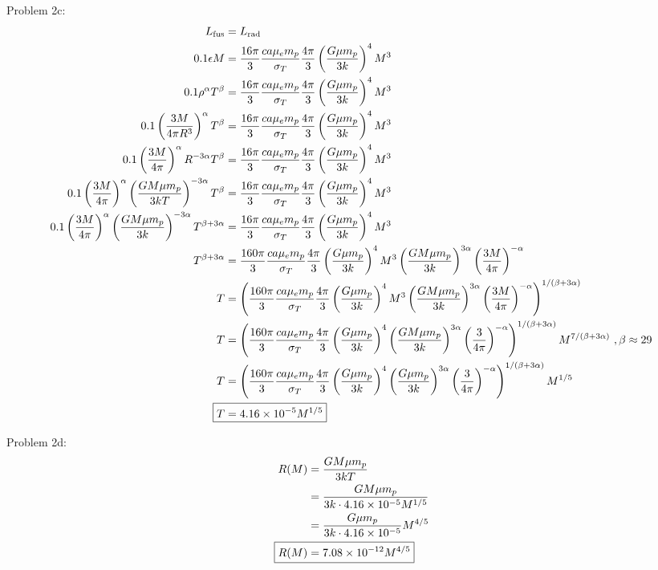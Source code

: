 \documentclass[10pt,letter,preprint]{aastex}
\newcommand{\rp}{\right)}
\newcommand{\lp}{\left(}
\begin{document}
\newpage
Problem 2c:\\
\begin{align}
L_{\textrm{fus}} &= L_{\textrm{rad}}\\
0.1 \epsilon M &=  \frac{16 \pi}{3} \frac{ca\mu_e m_p}{\sigma_T}\frac{4\pi}{3} \lp \frac{G\mu m_p}{3k} \rp^4 M^3 \\
0.1 \rho^\alpha T^\beta &=  \frac{16 \pi}{3} \frac{ca\mu_e m_p}{\sigma_T}\frac{4\pi}{3} \lp \frac{G\mu m_p}{3k} \rp^4 M^3 \\
0.1 \lp \frac{3M}{4 \pi R^3} \rp^\alpha T^\beta &=  \frac{16 \pi}{3} \frac{ca\mu_e m_p}{\sigma_T}\frac{4\pi}{3} \lp \frac{G\mu m_p}{3k} \rp^4 M^3\\
0.1 \lp \frac{3M}{4 \pi} \rp^\alpha R^{-3\alpha} T^\beta &=  \frac{16 \pi}{3} \frac{ca\mu_e m_p}{\sigma_T}\frac{4\pi}{3} \lp \frac{G\mu m_p}{3k} \rp^4 M^3\\
0.1 \lp \frac{3M}{4 \pi} \rp^\alpha \lp \frac{GM\mu m_p}{3kT} \rp^{-3\alpha} T^\beta &=  \frac{16 \pi}{3} \frac{ca\mu_e m_p}{\sigma_T}\frac{4\pi}{3} \lp \frac{G\mu m_p}{3k} \rp^4 M^3\\
0.1 \lp \frac{3M}{4 \pi} \rp^\alpha \lp \frac{GM\mu m_p}{3k} \rp^{-3\alpha} T^{\beta+3\alpha} &=  \frac{16 \pi}{3} \frac{ca\mu_e m_p}{\sigma_T}\frac{4\pi}{3} \lp \frac{G\mu m_p}{3k} \rp^4 M^3\\
 T^{\beta+3\alpha} &=  \frac{160 \pi}{3} \frac{ca\mu_e m_p}{\sigma_T}\frac{4\pi}{3} \lp \frac{G\mu m_p}{3k} \rp^4 M^3  \lp \frac{GM\mu m_p}{3k} \rp^{3\alpha} \lp \frac{3M}{4 \pi} \rp^{-\alpha}\\
 T &= \lp \frac{160 \pi}{3} \frac{ca\mu_e m_p}{\sigma_T}\frac{4\pi}{3} \lp \frac{G\mu m_p}{3k} \rp^4 M^3  \lp \frac{GM\mu m_p}{3k} \rp^{3\alpha} \lp \frac{3M}{4 \pi} \rp^{-\alpha} \rp^{1/(\beta + 3\alpha)}\\
 T &= \lp \frac{160 \pi}{3} \frac{ca\mu_e m_p}{\sigma_T}\frac{4\pi}{3} \lp \frac{G\mu m_p}{3k} \rp^4  \lp \frac{GM\mu m_p}{3k} \rp^{3\alpha} \lp \frac{3}{4 \pi} \rp^{-\alpha} \rp^{1/(\beta + 3\alpha)} M^{7/(\beta + 3\alpha)} ~, \beta \approx 29\\
 T &= \lp \frac{160 \pi}{3} \frac{ca\mu_e m_p}{\sigma_T}\frac{4\pi}{3} \lp \frac{G\mu m_p}{3k} \rp^4  \lp \frac{G\mu m_p}{3k} \rp^{3\alpha} \lp \frac{3}{4 \pi} \rp^{-\alpha} \rp^{1/(\beta + 3\alpha)} M^{1/5}\\
\Aboxed{  T&= 4.16 \times 10^{-5} M^{1/5}}
\end{align}

Problem 2d:\\
\begin{align}
R(M) &= \frac{GM\mu m_p}{3kT}\\
&=  \frac{GM\mu m_p}{3k\cdot4.16 \times 10^{-5} M^{1/5}}\\
&=  \frac{G\mu m_p}{3k\cdot4.16 \times 10^{-5} } M^{4/5}\\
\Aboxed{R(M)&= 7.08 \times 10^{-12}  M^{4/5}}
\end{align}
\end{document}
